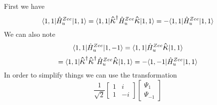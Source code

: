 \documentclass[12pt]{article}
\newcommand{\K}{\mathlarger{\mathlarger{\hat{\kappa}}}}
\begin{document}
First we have
\begin{equation}
\langle 1,1 |            \hat{H}^{Zee}_{u}   | 1,1  \rangle
=\langle 1,1 |\K^{\dagger} \hat{H}^{Zee}_{u}\K | 1,1   \rangle
=-\langle 1,1 |\hat{H}^{Zee}_{u}| 1,1  \rangle
\end{equation}
\noindent We can also note 
\begin{equation*}
\langle 1,1 | \hat{H}^{Zee}_{u} | 1,-1  \rangle
=
  \langle 1,1 |                  \hat{H}^{Zee}_{u}\K | 1,1  \rangle
\end{equation*}
\begin{equation}
= \langle 1,1 |\K^{\dagger}\K^{\dagger} \hat{H}^{Zee}_{u}\K   | 1,1  \rangle
= - \langle 1,-1 |\hat{H}^{Zee}_{u} | 1,1  \rangle
\end{equation}
\noindent In order to simplify things we can use the transformation
\begin{equation}
\frac{1}{\sqrt{2}}
\begin{bmatrix}
1 &  i \\ 
1 & -i 
\end{bmatrix}
\begin{bmatrix}
\Psi_{1}\\
\Psi_{-1}
\end{bmatrix}
\end{equation}
\end{document}
